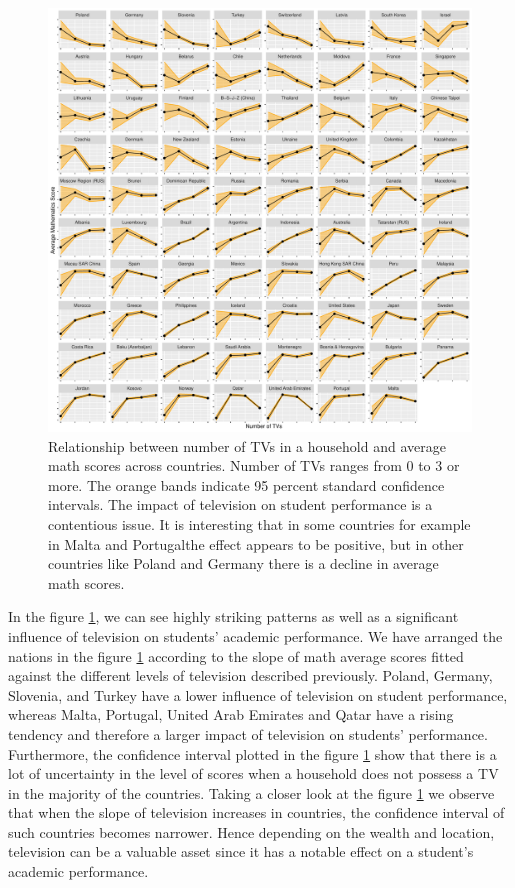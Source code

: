 \begin{figure}[H]
\includegraphics[width=1\linewidth]{learningtower_files/figure-latex/tv-plot-1} \caption{Relationship  between number of TVs in a household and average math scores across countries. Number of TVs ranges from 0 to 3 or more. The orange bands indicate 95 percent standard confidence intervals. The impact of television on student performance is a contentious issue. It is interesting that in some countries for example in Malta and Portugalthe effect appears to be positive, but in other countries like Poland and Germany there is a decline in average math scores.}\label{fig:tv-plot}
\end{figure}

In the figure \ref{fig:tv-plot}, we can see highly striking patterns as well as a significant influence of television on students' academic performance. We have arranged the nations in the figure \ref{fig:tv-plot} according to the slope of math average scores fitted against the different levels of television described previously. Poland, Germany, Slovenia, and Turkey have a lower influence of television on student performance, whereas Malta, Portugal, United Arab Emirates and Qatar have a rising tendency and therefore a larger impact of television on students' performance. Furthermore, the confidence interval plotted in the figure \ref{fig:tv-plot} show that there is a lot of uncertainty in the level of scores when a household does not possess a TV in the majority of the countries. Taking a closer look at the figure \ref{fig:tv-plot} we observe that when the slope of television increases in countries, the confidence interval of such countries becomes narrower. Hence depending on the wealth and location, television can be a valuable asset since it has a notable effect on a student's academic performance.

